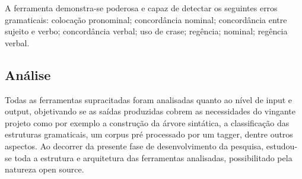 A ferramenta demonstra-se poderosa e capaz de detectar os seguintes erros gramaticais: colocação pronominal; concordância nominal; concordância entre sujeito e verbo; concordância verbal; uso de crase; regência; nominal; regência verbal.

\subsection{Análise}
Todas as ferramentas supracitadas foram analisadas quanto ao nível de input e output, objetivando se as saídas produzidas cobrem as necessidades do vingante projeto como por exemplo a construção da árvore sintática, a classificação das estruturas gramaticais, um corpus pré processado por um tagger, dentre outros aspectos.
Ao decorrer da presente fase de desenvolvimento da pesquisa, estudou-se toda a estrutura e arquitetura das ferramentas analisadas, possibilitado pela natureza open source.